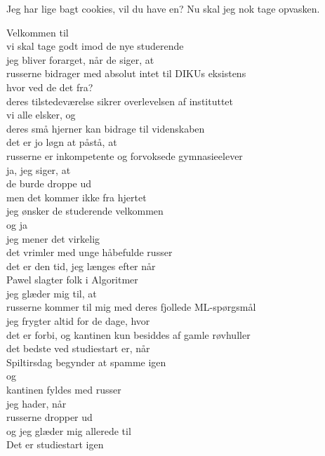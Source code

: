 \documentclass[a4paper,11pt]{article}
\begin{document}
\begin{sketch}


 Jeg har lige bagt cookies, vil du have en? Nu skal jeg nok tage opvasken.



 Velkommen til\\
vi skal tage godt imod de nye studerende\\
jeg bliver forarget, når de siger, at\\
russerne bidrager med absolut intet til DIKUs eksistens\\
hvor ved de det fra?\\
deres tilstedeværelse sikrer overlevelsen af instituttet\\
vi alle elsker, og\\
deres små hjerner kan bidrage til videnskaben\\
det er jo løgn at påstå, at\\
russerne er inkompetente og forvoksede gymnasieelever\\
ja, jeg siger, at\\
de burde droppe ud\\
men det kommer ikke fra hjertet\\
jeg ønsker de studerende velkommen\\
og ja\\
jeg mener det virkelig\\
det vrimler med unge håbefulde russer\\
det er den tid, jeg længes efter når\\
Pawel slagter folk i Algoritmer\\
jeg glæder mig til, at\\
russerne kommer til mig med deres fjollede ML-spørgsmål\\
jeg frygter altid for de dage, hvor\\
det er forbi, og kantinen kun besiddes af gamle røvhuller\\
det bedste ved studiestart er, når\\
Spiltirsdag begynder at spamme igen\\
og\\
kantinen fyldes med russer\\
jeg hader, når\\
russerne dropper ud\\
og jeg glæder mig allerede til\\
Det er studiestart igen\\

\end{sketch}
\end{document}
